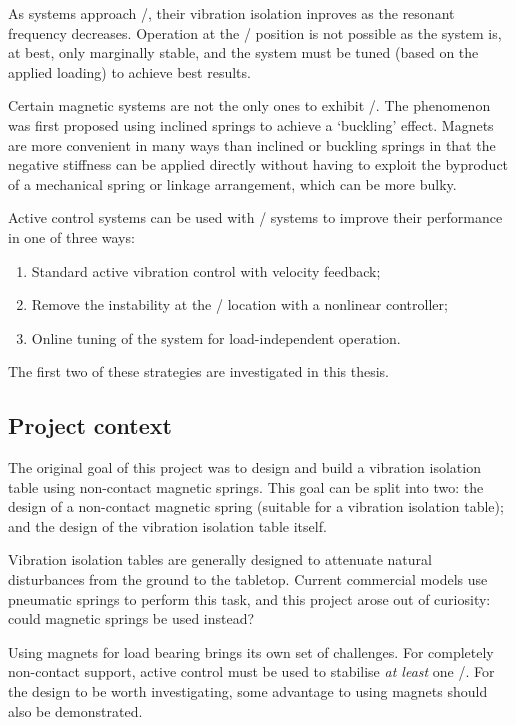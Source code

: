As systems approach \qzs/, their vibration isolation inproves as the resonant frequency decreases.
Operation at the \qzs/ position is not possible as the system is, at best, only marginally stable, and the system must be tuned (based on the applied loading) to achieve best results.

Certain magnetic systems are not the only ones to exhibit \qzs/.
The phenomenon was first proposed using inclined springs to achieve a `buckling' effect.
Magnets are more convenient in many ways than inclined or buckling springs in that the negative stiffness can be applied directly without having to exploit the byproduct of a mechanical spring or linkage arrangement, which can be more bulky.

Active control systems can be used with \qzs/ systems to improve their  performance in one of three ways:
\begin{enumerate}
  \item Standard active vibration control with velocity feedback;
  \item Remove the instability at the \qzs/ location with a nonlinear controller;
  \item Online tuning of the system for load-independent operation.
\end{enumerate}
The first two of these strategies are investigated in this thesis.


\subsection{Project context}

The original goal of this project was to design and build a vibration isolation table using non-contact magnetic springs.
This goal can be split into two: the design of a non-contact magnetic spring (suitable for a vibration isolation table); and the design of the vibration isolation table itself.

Vibration isolation tables are generally designed to attenuate natural disturbances from the ground to the tabletop.
Current commercial models use pneumatic springs to perform this task, and this project arose out of curiosity: could magnetic springs be used instead?

Using magnets for load bearing brings its own set of challenges.
For completely non-contact support, active control must be used to stabilise \emph{at least} one \dof/.
For the design to be worth investigating, some advantage to using magnets should also be demonstrated.


